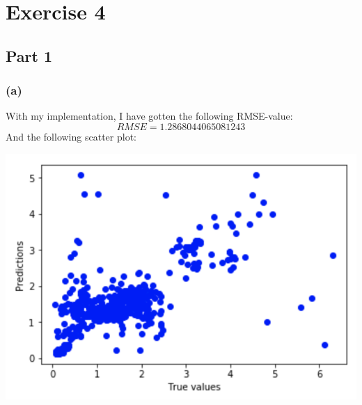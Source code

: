 \documentclass{report}
\begin{document}
\section*{Exercise 4}
\subsection*{Part 1}
\subsubsection*{(a)}
With my implementation, I have gotten the following RMSE-value:
$$RMSE = 1.2868044065081243$$
And the following scatter plot:
\begin{center}
    \includegraphics[height = 7 cm]{kNN_Scatter_a}
\end{center}
\end{document}
